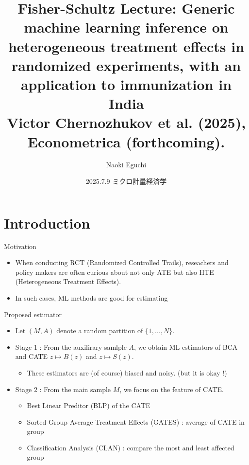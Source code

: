 \documentclass[xcolor=svgnames,aspectratio=169]{beamer}
\begin{document}
 

\title{Fisher-Schultz Lecture: Generic machine learning inference on heterogeneous treatment effects in randomized experiments, with an application to immunization in India \\ \small{Victor Chernozhukov et al. (2025), Econometrica (forthcoming).}}
\author{Naoki Eguchi}          
\date{2025.7.9 ミクロ計量経済学}

\begin{frame}                  
    \titlepage                     
\end{frame}

\section{Introduction}

\begin{frame}{Motivation}
    \begin{itemize}
        \item When conducting RCT (Randomized Controlled Trails), reseachers and policy makers are often curious about not only ATE but also HTE (Heterogeneous Treatment Effects).
        \item In such cases, ML methods are good for estimating
    \end{itemize}
\end{frame}

\begin{frame}{Proposed estimator}
    \begin{itemize}
        \item Let $(M,A)$ denote a random partition of $\{1,...,N\}$.
        \item Stage 1 : From the auxilirary samlple $A$, we obtain ML estimators of BCA and CATE $z\mapsto B(z)$ and $z\mapsto S(z)$.
        \begin{itemize}
            \item These estimators are (of course) biased and noisy. (but it is okay !) 
        \end{itemize}
        \item Stage 2 : From the main sample $M$, we focus on the \alert{feature} of CATE.
        \begin{itemize}
            \item Best Linear Preditor (BLP) of the CATE
            \item Sorted Group Average Treatment Effects (GATES) : average of CATE in group
            \item Classification Analysis (CLAN) : compare the most and least affected group
        \end{itemize}
    \end{itemize}
\end{frame}
\end{document}

